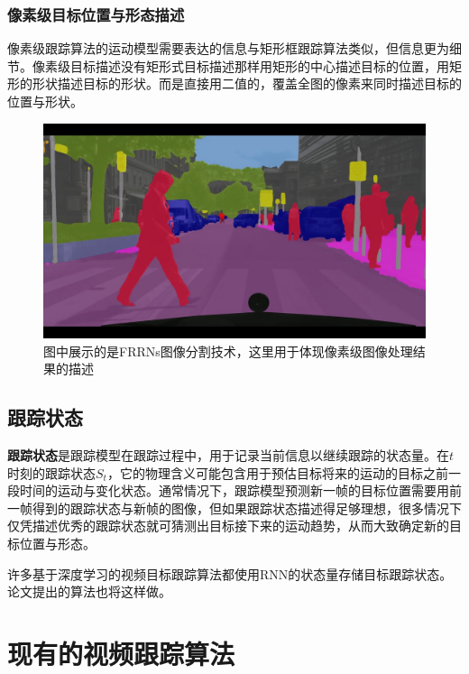 \subsubsection{像素级目标位置与形态描述}
像素级跟踪算法的运动模型需要表达的信息与矩形框跟踪算法类似，但信息更为细节。像素级目标描述没有矩形式目标描述那样用矩形的中心描述目标的位置，用矩形的形状描述目标的形状。而是直接用二值的，覆盖全图的像素来同时描述目标的位置与形状。
\par
\begin{figure}[htbp!]
    \centering
    \includegraphics[width = 1.\textwidth]{chap/img/maxresdefault.jpg}
    \caption{图中展示的是FRRNs图像分割技术\supercite{frnn_youtube}\supercite{pohlen2017full}，这里用于体现像素级图像处理结果的描述}
    \label{fig:bunding_boxes}
\end{figure}
\par

\subsection{跟踪状态} \label{section:tracking_state}
\textbf{跟踪状态}是跟踪模型在跟踪过程中，用于记录当前信息以继续跟踪的状态量。在$t$时刻的跟踪状态$S_t$，它的物理含义可能包含用于预估目标将来的运动的目标之前一段时间的运动与变化状态。通常情况下，跟踪模型预测新一帧的目标位置需要用前一帧得到的跟踪状态与新帧的图像，但如果跟踪状态描述得足够理想，很多情况下仅凭描述优秀的跟踪状态就可猜测出目标接下来的运动趋势，从而大致确定新的目标位置与形态。
\par
许多基于深度学习的视频目标跟踪算法都使用RNN的状态量存储目标跟踪状态。论文提出的算法也将这样做。


\section{现有的视频跟踪算法}
